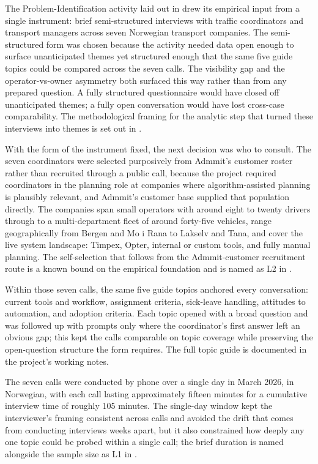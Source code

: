 The Problem-Identification activity laid out in  drew its empirical input from a single instrument: brief semi-structured interviews with traffic coordinators and transport managers across seven Norwegian transport companies. The semi-structured form was chosen because the activity needed data open enough to surface unanticipated themes yet structured enough that the same five guide topics could be compared across the seven calls. The visibility gap and the operator-vs-owner asymmetry both surfaced this way rather than from any prepared question. A fully structured questionnaire would have closed off unanticipated themes; a fully open conversation would have lost cross-case comparability. The methodological framing for the analytic step that turned these interviews into themes is set out in .

With the form of the instrument fixed, the next decision was who to consult. The seven coordinators were selected purposively from Admmit's customer roster rather than recruited through a public call, because the project required coordinators in the planning role at companies where algorithm-assisted planning is plausibly relevant, and Admmit's customer base supplied that population directly. The companies span small operators with around eight to twenty drivers through to a multi-department fleet of around forty-five vehicles, range geographically from Bergen and Mo i Rana to Lakselv and Tana, and cover the live system landscape: Timpex, Opter, internal or custom tools, and fully manual planning. The self-selection that follows from the Admmit-customer recruitment route is a known bound on the empirical foundation and is named as L2 in .

Within those seven calls, the same five guide topics anchored every conversation: current tools and workflow, assignment criteria, sick-leave handling, attitudes to automation, and adoption criteria. Each topic opened with a broad question and was followed up with prompts only where the coordinator's first answer left an obvious gap; this kept the calls comparable on topic coverage while preserving the open-question structure the form requires. The full topic guide is documented in the project's working notes.

The seven calls were conducted by phone over a single day in March 2026, in Norwegian, with each call lasting approximately fifteen minutes for a cumulative interview time of roughly 105 minutes. The single-day window kept the interviewer's framing consistent across calls and avoided the drift that comes from conducting interviews weeks apart, but it also constrained how deeply any one topic could be probed within a single call; the brief duration is named alongside the sample size as L1 in .

